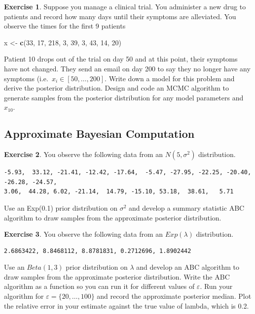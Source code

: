 \documentclass[
]{book}
\newenvironment{Shaded}{\begin{snugshade}}{\end{snugshade}}
\newcommand{\DecValTok}[1]{\textcolor[rgb]{0.00,0.00,0.81}{#1}}
\newcommand{\FunctionTok}[1]{\textcolor[rgb]{0.13,0.29,0.53}{\textbf{#1}}}
\newcommand{\NormalTok}[1]{#1}
\newcommand{\OtherTok}[1]{\textcolor[rgb]{0.56,0.35,0.01}{#1}}
\theoremstyle{definition}
\theoremstyle{definition}
\theoremstyle{definition}
\newtheorem{exercise}{Exercise}[chapter]
\theoremstyle{definition}
\theoremstyle{remark}
\begin{document}
\begin{exercise}
Suppose you manage a clinical trial. You administer a new drug to patients and record how many days until their symptoms are alleviated. You observe the times for the first 9 patients

\begin{Shaded}
\begin{Highlighting}[]
\NormalTok{x }\OtherTok{\textless{}{-}} \FunctionTok{c}\NormalTok{(}\DecValTok{33}\NormalTok{,  }\DecValTok{17}\NormalTok{, }\DecValTok{218}\NormalTok{,   }\DecValTok{3}\NormalTok{,  }\DecValTok{39}\NormalTok{,   }\DecValTok{3}\NormalTok{,  }\DecValTok{43}\NormalTok{,  }\DecValTok{14}\NormalTok{,  }\DecValTok{20}\NormalTok{)}
\end{Highlighting}
\end{Shaded}

Patient 10 drops out of the trial on day 50 and at this point, their symptoms have not changed. They send an email on day 200 to say they no longer have any symptoms (i.e.~\(x_i \in [50, \ldots, 200]\). Write down a model for this problem and derive the posterior distribution. Design and code an MCMC algorithm to generate samples from the posterior distribution for any model parameters and \(x_{10}\).
\end{exercise}

\hypertarget{approximate-bayesian-computation-1}{%
\subsection{Approximate Bayesian Computation}\label{approximate-bayesian-computation-1}}

\begin{exercise}
You observe the following data from an \(N(5, \sigma^2)\) distribution.

\begin{verbatim}
-5.93,  33.12, -21.41, -12.42, -17.64,  -5.47, -27.95, -22.25, -20.40, -26.28, -24.57,  
3.06,  44.28, 6.02, -21.14,  14.79, -15.10, 53.18,  38.61,   5.71
\end{verbatim}

Use an Exp(0.1) prior distribution on \(\sigma^2\) and develop a summary statistic ABC algorithm to draw samples from the approximate posterior distribution.
\end{exercise}

\begin{exercise}
You observe the following data from an \(Exp(\lambda)\) distribution.

\begin{verbatim}
2.6863422, 8.8468112, 8.8781831, 0.2712696, 1.8902442
\end{verbatim}

Use an \(Beta(1, 3)\) prior distribution on \(\lambda\) and develop an ABC algorithm to draw samples from the approximate posterior distribution. Write the ABC algorithm as a function so you can run it for different values of \(\varepsilon\). Run your algorithm for \(\varepsilon = \{20, \ldots, 100\}\) and record the approximate posterior median. Plot the relative error in your estimate against the true value of lambda, which is 0.2.
\end{exercise}

  
\end{document}
